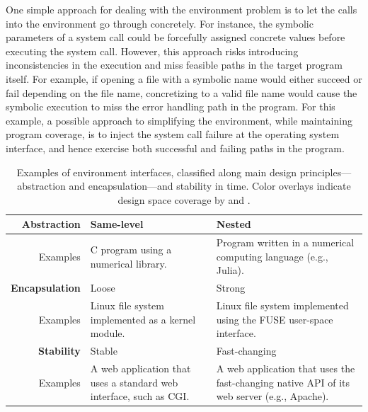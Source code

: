 One simple approach for dealing with the environment problem is to let the calls into the environment go through concretely.  For instance, the symbolic parameters of a system call could be forcefully assigned concrete values before executing the system call.
%
However, this approach risks introducing inconsistencies in the execution and miss feasible paths in the target program itself.
%
For example, if opening a file with a symbolic name would either succeed or fail depending on the file name, concretizing to a valid file name would cause the symbolic execution to miss the error handling path in the program.
%
For this example, a possible approach to simplifying the environment, while maintaining program coverage, is to inject the system call failure at the operating system interface, and hence exercise both successful and failing paths in the program.

\newcommand{\cnineccolor}{\cellcolor{GreenYellow}}
\newcommand{\chefccolor}{\cellcolor{SkyBlue}}

\begin{table}
  \centering
  \small
  \begin{tabular}{r p{5cm} p{5cm}}
    
    \textbf{Abstraction} & \cnineccolor Same-level & \chefccolor Nested \\
    \hline
    \bigskip Examples      & C program using a numerical library.    & Program written in a numerical computing language (e.g., Julia). \\
    
    \textbf{Encapsulation} & \chefccolor Loose & \cnineccolor Strong \\
    \hline
    \bigskip Examples      & Linux file system implemented as a kernel module.   & Linux file system implemented using the FUSE user-space interface. \\
    
    \textbf{Stability}   & \cnineccolor Stable    & \chefccolor Fast-changing \\
    \hline
        Examples          & A web application that uses a standard web interface, such as CGI.    & A web application that uses the fast-changing native API of its web server (e.g., Apache). \\
  \end{tabular}
  \caption{Examples of environment interfaces, classified along main design principles---abstraction and encapsulation---and stability in time.  Color overlays indicate design space coverage by \colorbox{GreenYellow}{\cnine} and \colorbox{SkyBlue}{\chef}.}
  \label{tab:intro:env}
\end{table}

